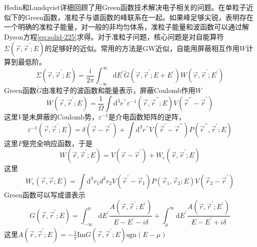 Hedin和Lundqvist详细回顾了用Green函数技术解决电子相关的问题\cite{Hedin-Lundqvist}。在单粒子近似下的Green函数，准粒子与谱函数的峰联系在一起。如果峰足够尖锐，表明存在一个明确的准粒子能量，对一般的非均匀体系，准粒子能量和波函数可以通过解Dyson方程\eqref{eq:solid-225}求得。对于准粒子问题，核心问题是对自能算符$\Sigma(\vec r,\vec r^{\prime};E)$的足够好的近似。常用的方法是GW近似\cite{PR139-A796_1965}，自能用屏蔽相互作用$W$计算到最低阶。
\begin{equation}
	\Sigma(\vec r,\vec r^{\prime};E)=\dfrac{\mathrm{i}}{2\pi}\int_{-\infty}^{\infty}\mathrm{d}E^{\prime}\tilde G(\vec r,\vec r^{\prime};E+E^{\prime})W(\vec r,\vec r^{\prime};E^{\prime})
  \label{eq:solid-229}
\end{equation}
Green函数$\tilde G$由准粒子的波函数和能量表示，屏蔽Coulomb作用$W$
\begin{equation}
	W(\vec r,\vec r^{\prime};E)=\frac1{\Omega}\int\mathrm{d}^3r^{\prime\prime}\varepsilon^{-1}(\vec r,\vec r^{\prime\prime};E)V(\vec r^{\prime\prime}-\vec r^{\prime})
  \label{eq:solid-230}
\end{equation}
这里$V$是未屏蔽的Coulomb势，$\varepsilon^{-1}$是介电函数矩阵的逆阵，
\begin{equation}
	\varepsilon^{-1}(\vec r,\vec r^{\prime};E)=\delta(\vec r-\vec r^{\prime})+\int\mathrm{d}^3r^{\prime\prime}V(\vec r^{\prime}-\vec r^{\prime\prime})P(\vec r^{\prime\prime},\vec r^{\prime};E)
  \label{eq:solid-231}
\end{equation}
这里$P$是完全响应函数，于是
\begin{equation}
  W(\vec r,\vec r^{\prime};E)=V(\vec r-\vec r^{\prime})+W_c(\vec r,\vec r^{\prime};E)
  \label{eq:solid-232}
\end{equation}
这里
\begin{equation}
	W_c(\vec r,\vec r;E)=\int\mathrm{d}^3r_1d^3r_2V(\vec r^{\prime}-\vec r_1)P(\vec r_1,\vec r_2;E)V(\vec r_2-\vec r^{\prime})
  \label{eq:solid-233}
\end{equation}
Green函数可以写成谱表示
\begin{equation}
	G(\vec r,\vec r^{\prime};E)=\int_{-\infty}^{\mu}\mathrm{d}E^{\prime}\frac{A(\vec r,\vec r^{\prime};E^{\prime})}{E-E^{\prime}-i\delta}+\int_{\mu}^{\infty}\mathrm{d}E^{\prime}\frac{A(\vec r,\vec r^{\prime};E^{\prime})}{E-E^{\prime}+i\delta}
  \label{eq:solid-234}
\end{equation}
这里$A(\vec r,\vec r^{\prime};E)=-\frac1{\pi}\mathrm{Im}G(\vec r,\vec r^{\prime};E)\mathrm{sgn}(E-\mu)$

